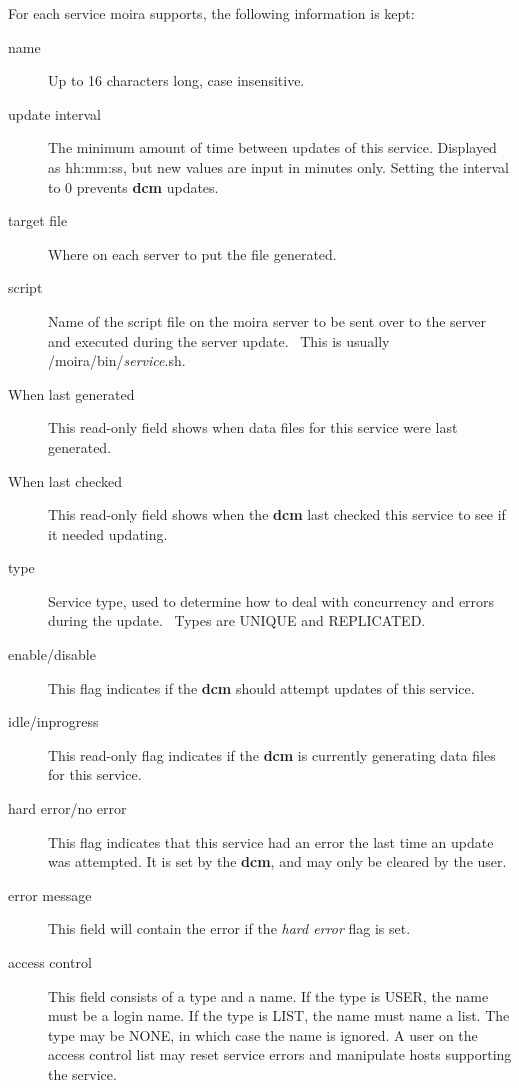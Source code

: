 For each service moira supports, the following information is kept:
\begin{description}
\item[name] Up to 16 characters long, case insensitive.
\item[update interval] The minimum amount of time between updates of this
service.  Displayed as hh:mm:ss, but new values are input in minutes
only.  Setting the interval to 0 prevents {\bf dcm} updates.
\item[target file] Where on each server to put the file generated.
\item[script] Name of the script file on the moira server to be sent over to
the server and executed during the server update.  \athena\ This is
usually /moira/bin/{\em service}.sh.
\item[When last generated] This read-only field shows when data files for
this service were last generated.
\item[When last checked] This read-only field shows when the {\bf dcm} last
checked this service to see if it needed updating.
\item[type] Service type, used to determine how to deal with concurrency and
errors during the update.  \athena\ Types are UNIQUE and REPLICATED.
\item[enable/disable] This flag indicates if the {\bf dcm} should attempt
updates of this service.
\item[idle/inprogress] This read-only flag indicates if the {\bf dcm} is
currently generating data files for this service. 
\item[hard error/no error] This flag indicates that this service had an
error the last time an update was attempted.  It is set by the
{\bf dcm}, and may only be cleared by the user.
\item[error message] This field will contain the error if the {\em hard error}
flag is set.
\item[access control] This field consists of a type and a name.  If the type
is USER, the name must be a login name.  If the type is LIST, the name
must name a list.  The type may be NONE, in which case the name is
ignored.  A user on the access control list may reset service errors
and manipulate hosts supporting the service.
\end{description}


